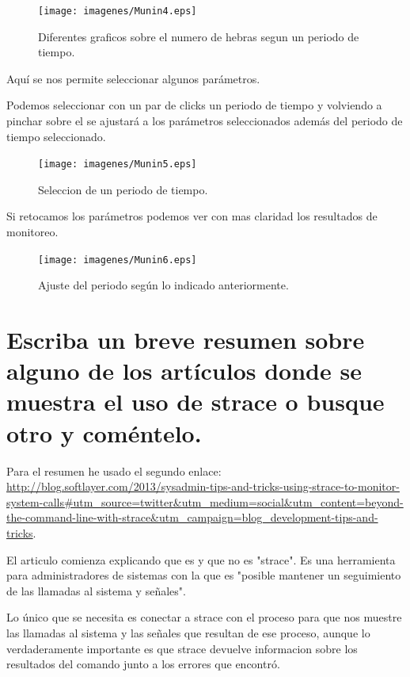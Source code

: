 \begin{figure}[H]
\begin{center}
\texttt{[image: imagenes/Munin4.eps]}
\caption{Diferentes graficos sobre el numero de hebras segun un periodo de tiempo.}
\end{center}
\end{figure}

Aquí se nos permite seleccionar algunos parámetros.

Podemos seleccionar con un par de clicks un periodo de tiempo y volviendo a pinchar sobre el se ajustará a los parámetros seleccionados además del periodo de tiempo seleccionado.

\begin{figure}[H]
\begin{center}
\texttt{[image: imagenes/Munin5.eps]}
\caption{Seleccion de un periodo de tiempo.}
\end{center}
\end{figure}

Si retocamos los parámetros podemos  ver con mas claridad los resultados de monitoreo.


\begin{figure}[H]
\begin{center}
\texttt{[image: imagenes/Munin6.eps]}
\caption{Ajuste del periodo según lo indicado anteriormente.}
\end{center}
\end{figure}



\section{Escriba un breve resumen sobre alguno de los artículos donde se muestra el uso de strace o busque otro y coméntelo.}


Para el resumen he usado el segundo enlace: \url{ http://blog.softlayer.com/2013/sysadmin-tips-and-tricks-using-strace-to-monitor-system-calls#utm_source=twitter&utm_medium=social&utm_content=beyond-the-command-line-with-strace&utm_campaign=blog_development-tips-and-tricks}.

El articulo comienza explicando que es y que no es "strace". Es una herramienta para administradores de sistemas con la que es "posible mantener un seguimiento de las llamadas al sistema y señales".

Lo único que se necesita es conectar a strace con el proceso para que nos muestre las llamadas al sistema y las señales que resultan de ese proceso, aunque lo verdaderamente importante es que strace devuelve informacion sobre los resultados del comando junto a los errores que encontró.

